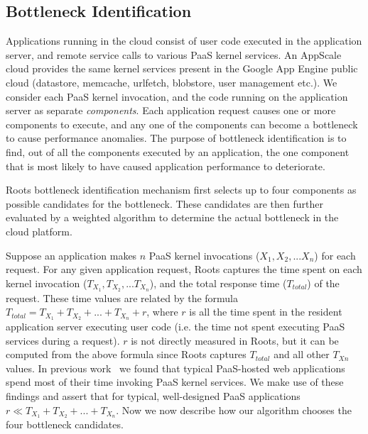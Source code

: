 \subsection{Bottleneck Identification}


Applications running in the cloud consist of user code executed in the application server, 
and remote service calls to various PaaS kernel services. An AppScale cloud
provides the same kernel services present in the Google App Engine public cloud (datastore, memcache,
urlfetch, blobstore, user management etc.).
We consider each PaaS kernel invocation, and the code running on the application server as 
separate \textit{components}. Each application request causes one or more components to
execute, and any one of the components can become a bottleneck to cause performance anomalies.  
The purpose of bottleneck identification is to find, out of all
the components executed by an application, the one component that is most likely to have caused 
application performance to deteriorate.

Roots bottleneck identification mechanism first
selects up to four components as possible candidates
for the bottleneck. These candidates are then further evaluated by a weighted algorithm to
determine the actual bottleneck in the cloud platform.

Suppose an application makes $n$ PaaS kernel invocations ($X_1, X_2, ... X_n$) for each request. 
For any given application request,
Roots captures the time spent on each kernel invocation ($T_{X_1}, T_{X_2}, ... T_{X_n}$), and the 
total response time ($T_{total}$) of the request. These time values are related by the formula
$T_{total} = T_{X_1} + T_{X_2} + ... + T_{X_n} + r$, where $r$ is all the time spent in the resident 
application server executing user code (i.e. the time not
spent executing PaaS services during a request). $r$ is not
directly measured in Roots, but it can be computed from the above formula 
since Roots captures $T_{total}$ and all other $T_{Xn}$ values. In previous
work~\cite{Jayathilaka:2015:RTS:2806777.2806842} we found that typical
PaaS-hosted web applications spend most of their time invoking PaaS kernel services.
We make use of these findings and assert that for typical,
well-designed PaaS applications $r \ll T_{X_1} + T_{X_2} + ... + T_{X_n}$.
Now we now describe how our algorithm chooses the four bottleneck candidates.

